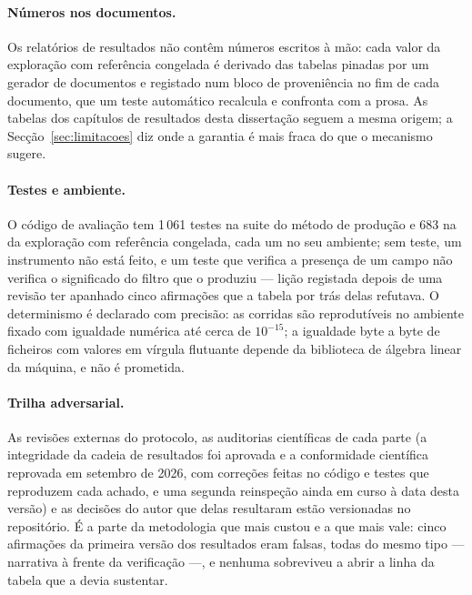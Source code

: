 \paragraph{Números nos documentos.} Os relatórios de resultados não
contêm números escritos à mão: cada valor da exploração com referência
congelada é derivado das tabelas pinadas por um gerador de documentos e
registado num bloco de proveniência no fim de cada documento, que um teste
automático recalcula e confronta com a prosa. As tabelas dos capítulos de
resultados desta dissertação seguem a mesma origem; a Secção~\ref{sec:limitacoes}
diz onde a garantia é mais fraca do que o mecanismo sugere.

\paragraph{Testes e ambiente.} O código de avaliação tem 1\,061 testes na
suite do método de produção e 683 na da exploração com referência
congelada, cada um no seu ambiente; sem teste, um instrumento não está
feito, e um teste que verifica a presença de um campo não verifica o
significado do filtro que o produziu --- lição registada depois de uma
revisão ter apanhado cinco afirmações que a tabela por trás delas refutava.
O determinismo é declarado com precisão: as corridas são reprodutíveis no
ambiente fixado com igualdade numérica até cerca de $10^{-15}$; a igualdade
byte a byte de ficheiros com valores em vírgula flutuante depende da
biblioteca de álgebra linear da máquina, e não é prometida.

\paragraph{Trilha adversarial.} As revisões externas do protocolo, as
auditorias científicas de cada parte (a integridade da cadeia de
resultados foi aprovada e a conformidade científica reprovada em setembro
de 2026, com correções feitas no código e testes que reproduzem cada
achado, e uma segunda reinspeção ainda em curso à data desta versão) e as
decisões do autor que delas resultaram estão versionadas no repositório.
É a parte da metodologia que
mais custou e a que mais vale: cinco afirmações da primeira versão dos
resultados eram falsas, todas do mesmo tipo --- narrativa à frente da
verificação ---, e nenhuma sobreviveu a abrir a linha da tabela que a
devia sustentar.
